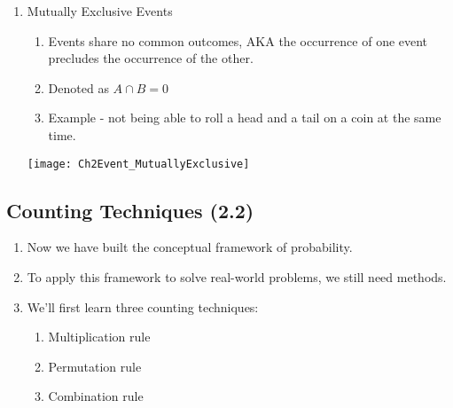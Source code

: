 \documentclass[../INDE315.tex]{subfiles}
\begin{document}
\begin{enumerate}
\begin{center}
        \end{center}
    \item Mutually Exclusive Events
        \begin{enumerate}
            \item Events share no common outcomes, AKA the occurrence of one event precludes the occurrence of the other.
            \item Denoted as $A \cap B = 0$ 
            \item Example - not being able to roll a head and a tail on a coin at the same time.
        \end{enumerate}
        \begin{center}
            \texttt{[image: Ch2Event\_MutuallyExclusive]}
        \end{center}
\end{enumerate}

\subsection*{Counting Techniques (2.2)}
\begin{enumerate}
    \item Now we have built the conceptual framework of probability.
    \item To apply this framework to solve real-world problems, we still need methods. 
    \item We'll first learn three counting techniques:
        \begin{enumerate}
            \item Multiplication rule
            \item Permutation rule
            \item Combination rule
        \end{enumerate}
\end{enumerate}
\end{document}
